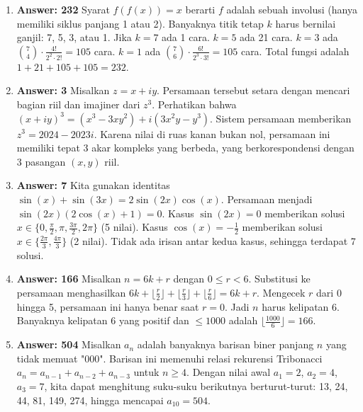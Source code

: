 \documentclass{scrartcl}
\begin{document}
\begin{enumerate}
\item  \textbf{Answer: 232} Syarat $f(f(x)) = x$ berarti $f$ adalah sebuah involusi (hanya memiliki siklus panjang 1 atau 2). Banyaknya titik tetap $k$ harus bernilai ganjil: 7, 5, 3, atau 1. Jika $k=7$ ada 1 cara. $k=5$ ada 21 cara. $k=3$ ada $\binom{7}{4} \cdot \frac{4!}{2^2 \cdot 2!} = 105$ cara. $k=1$ ada $\binom{7}{6} \cdot \frac{6!}{2^3 \cdot 3!} = 105$ cara. Total fungsi adalah $1 + 21 + 105 + 105 = 232$.

\item  \textbf{Answer: 3} Misalkan $z = x + iy$. Persamaan tersebut setara dengan mencari bagian riil dan imajiner dari $z^3$. Perhatikan bahwa $(x+iy)^3 = (x^3-3xy^2) + i(3x^2y-y^3)$. Sistem persamaan memberikan $z^3 = 2024 - 2023i$. Karena nilai di ruas kanan bukan nol, persamaan ini memiliki tepat 3 akar kompleks yang berbeda, yang berkorespondensi dengan 3 pasangan $(x,y)$ riil.

\item  \textbf{Answer: 7} Kita gunakan identitas $\sin(x) + \sin(3x) = 2 \sin(2x) \cos(x)$. Persamaan menjadi $\sin(2x) (2 \cos(x) + 1) = 0$. Kasus $\sin(2x) = 0$ memberikan solusi $x \in \{0, \frac{\pi}{2}, \pi, \frac{3\pi}{2}, 2\pi\}$ (5 nilai). Kasus $\cos(x) = -\frac{1}{2}$ memberikan solusi $x \in \{\frac{2\pi}{3}, \frac{4\pi}{3}\}$ (2 nilai). Tidak ada irisan antar kedua kasus, sehingga terdapat 7 solusi.

\item  \textbf{Answer: 166} Misalkan $n = 6k + r$ dengan $0 \le r < 6$. Substitusi ke persamaan menghasilkan $6k + \lfloor \frac{r}{2} \rfloor + \lfloor \frac{r}{3} \rfloor + \lfloor \frac{r}{6} \rfloor = 6k + r$. Mengecek $r$ dari 0 hingga 5, persamaan ini hanya benar saat $r = 0$. Jadi $n$ harus kelipatan 6. Banyaknya kelipatan 6 yang positif dan $\le 1000$ adalah $\lfloor \frac{1000}{6} \rfloor = 166$.

\item  \textbf{Answer: 504} Misalkan $a_n$ adalah banyaknya barisan biner panjang $n$ yang tidak memuat "000". Barisan ini memenuhi relasi rekurensi Tribonacci $a_n = a_{n-1} + a_{n-2} + a_{n-3}$ untuk $n \ge 4$. Dengan nilai awal $a_1 = 2$, $a_2 = 4$, $a_3 = 7$, kita dapat menghitung suku-suku berikutnya berturut-turut: 13, 24, 44, 81, 149, 274, hingga mencapai $a_{10} = 504$.
\end{enumerate}
\end{document}
